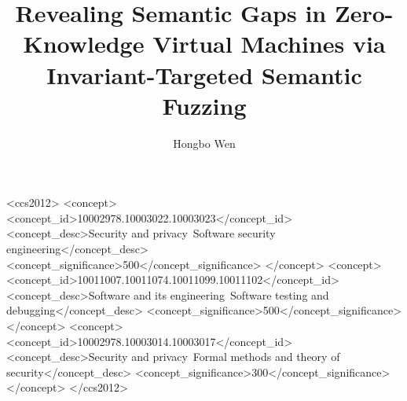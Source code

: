 \documentclass[sigconf,review,anonymous,screen]{acmart}
\begin{document}
\sloppy

\title{Revealing Semantic Gaps in Zero-Knowledge Virtual Machines via Invariant-Targeted Semantic Fuzzing}


\author{Hongbo Wen}





\begin{CCSXML}
<ccs2012>
   <concept>
       <concept_id>10002978.10003022.10003023</concept_id>
       <concept_desc>Security and privacy~Software security engineering</concept_desc>
       <concept_significance>500</concept_significance>
       </concept>
   <concept>
       <concept_id>10011007.10011074.10011099.10011102</concept_id>
       <concept_desc>Software and its engineering~Software testing and debugging</concept_desc>
       <concept_significance>500</concept_significance>
       </concept>
   <concept>
       <concept_id>10002978.10003014.10003017</concept_id>
       <concept_desc>Security and privacy~Formal methods and theory of security</concept_desc>
       <concept_significance>300</concept_significance>
       </concept>
 </ccs2012>
\end{CCSXML}

\end{document}
